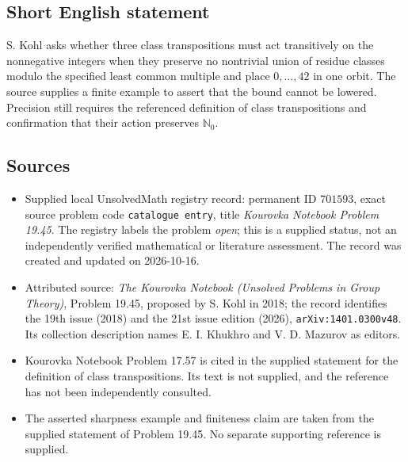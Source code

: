 \documentclass[11pt]{article}
\begin{document}
\subsection{Short English statement}
S. Kohl asks whether three class transpositions must act transitively on the nonnegative integers when they preserve no nontrivial union of residue classes modulo the specified least common multiple and place \(0,\ldots,42\) in one orbit. The source supplies a finite example to assert that the bound cannot be lowered. Precision still requires the referenced definition of class transpositions and confirmation that their action preserves \(\mathbb{N}_0\).
\subsection{Sources}
\begin{itemize}
\item Supplied local UnsolvedMath registry record: permanent ID \(701593\), exact source problem code \texttt{catalogue entry}, title \emph{Kourovka Notebook Problem 19.45}. The registry labels the problem \emph{open}; this is a supplied status, not an independently verified mathematical or literature assessment. The record was created and updated on 2026-10-16.
\item Attributed source: \emph{The Kourovka Notebook (Unsolved Problems in Group Theory)}, Problem 19.45, proposed by S. Kohl in 2018; the record identifies the 19th issue (2018) and the 21st issue edition (2026), \texttt{arXiv:1401.0300v48}. Its collection description names E. I. Khukhro and V. D. Mazurov as editors.
\item Kourovka Notebook Problem 17.57 is cited in the supplied statement for the definition of class transpositions. Its text is not supplied, and the reference has not been independently consulted.
\item The asserted sharpness example and finiteness claim are taken from the supplied statement of Problem 19.45. No separate supporting reference is supplied.
\end{itemize}
\end{document}
